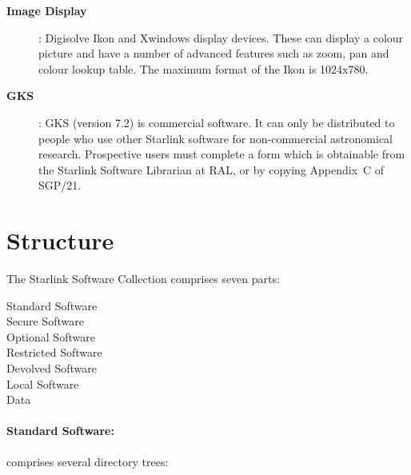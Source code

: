 \begin{description}
\item [\bf Image Display]: Digisolve Ikon and Xwindows display devices. These
can display a colour picture and have a number of advanced features such as
zoom, pan and colour lookup table. The maximum format of the Ikon is 1024x780.

\item [\bf GKS]: GKS (version 7.2) is commercial software. It can only be
distributed to people who use other Starlink software for non-commercial
astronomical research. Prospective users must complete a form which is
obtainable from the Starlink Software Librarian at RAL, or by copying
Appendix~C of SGP/21.

\end{description}

\section {Structure}
\label{se:struct}

The Starlink Software Collection comprises seven parts:
\begin{description}
\item [Standard Software]
\item [Secure Software]
\item [Optional Software]
\item [Restricted Software]
\item [Devolved Software]
\item [Local Software]
\item [Data]
\end{description}

\paragraph{Standard Software:} comprises several directory trees:

